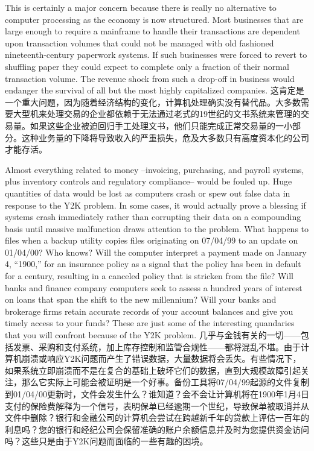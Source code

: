 \begin{Parallel}{97mm}{45mm}
  \ParallelLText
  {This is certainly a major concern because there is really no alternative to computer processing as the economy is now structured. Most businesses that are large enough to require a mainframe to handle their transactions are dependent upon transaction volumes that could not be managed with old fashioned nineteenth-century paperwork systems. If such businesses were forced to revert to shuffling paper they could expect to complete only a fraction of their normal transaction volume. The revenue shock from such a drop-off in business would endanger the survival of all but the most highly capitalized companies.}  
  \ParallelRText
  {\small 这肯定是一个重大问题，因为随着经济结构的变化，计算机处理确实没有替代品。大多数需要大型机来处理交易的企业都依赖于无法通过老式的19世纪的文书系统来管理的交易量。如果这些企业被迫回归手工处理文书，他们只能完成正常交易量的一小部分。这种业务量的下降将导致收入的严重损失，危及大多数只有高度资本化的公司才能存活。}
  \ParallelPar


  \ParallelLText
  {Almost everything related to money --invoicing, purchasing, and payroll systems, plus inventory controls and regulatory compliance-- would be fouled up. Huge quantities of data would be lost as computers crash or spew out false data in response to the Y2K problem. In some cases, it would actually prove a blessing if systems crash immediately rather than corrupting their data on a compounding basis until massive malfunction draws attention to the problem. What happens to files when a backup utility copies files originating on 07/04/99 to an update on 01/04/00? Who knows? Will the computer interpret a payment made on January 4, “1900,” for an insurance policy as a signal that the policy has been in default for a century, resulting in a canceled policy that is stricken from the file? Will banks and finance company computers seek to assess a hundred years of interest on loans that span the shift to the new millennium? Will your banks and brokerage firms retain accurate records of your account balances and give you timely access to your funds? These are just some of the interesting quandaries that you will confront because of the Y2K problem.}  
  \ParallelRText
  {\small 几乎与金钱有关的一切——包括发票、采购和支付系统，加上库存控制和监管合规性——都将混乱不堪。由于计算机崩溃或响应Y2K问题而产生了错误数据，大量数据将会丢失。有些情况下，如果系统立即崩溃而不是在复合的基础上破坏它们的数据，直到大规模故障引起关注，那么它实际上可能会被证明是一个好事。备份工具将07/04/99起源的文件复制到01/04/00更新时，文件会发生什么？谁知道？会不会让计算机将在1900年1月4日支付的保险费解释为一个信号，表明保单已经逾期一个世纪，导致保单被取消并从文件中删除？银行和金融公司的计算机会尝试在跨越新千年的贷款上评估一百年的利息吗？您的银行和经纪公司会保留准确的账户余额信息并及时为您提供资金访问吗？这些只是由于Y2K问题而面临的一些有趣的困境。}
  \ParallelPar



\end{Parallel}

